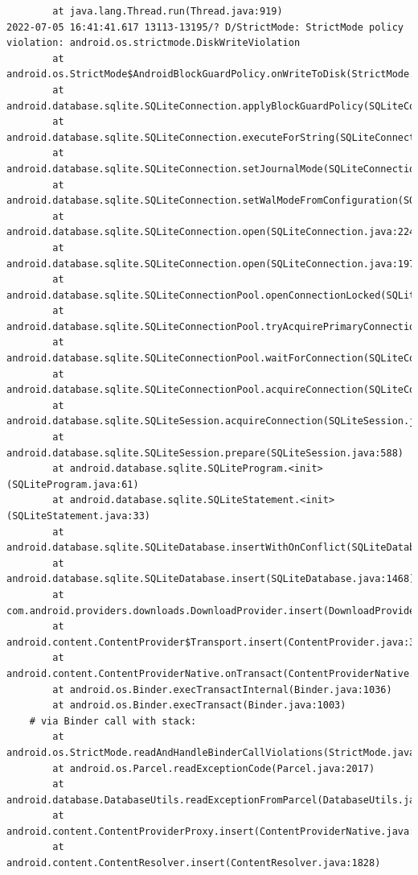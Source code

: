 \documentclass[a4paper,12pt]{book}
\begin{document}
\begin{lstlisting}
        at java.lang.Thread.run(Thread.java:919)
2022-07-05 16:41:41.617 13113-13195/? D/StrictMode: StrictMode policy violation: android.os.strictmode.DiskWriteViolation
        at android.os.StrictMode$AndroidBlockGuardPolicy.onWriteToDisk(StrictMode.java:1527)
        at android.database.sqlite.SQLiteConnection.applyBlockGuardPolicy(SQLiteConnection.java:1140)
        at android.database.sqlite.SQLiteConnection.executeForString(SQLiteConnection.java:733)
        at android.database.sqlite.SQLiteConnection.setJournalMode(SQLiteConnection.java:376)
        at android.database.sqlite.SQLiteConnection.setWalModeFromConfiguration(SQLiteConnection.java:316)
        at android.database.sqlite.SQLiteConnection.open(SQLiteConnection.java:224)
        at android.database.sqlite.SQLiteConnection.open(SQLiteConnection.java:197)
        at android.database.sqlite.SQLiteConnectionPool.openConnectionLocked(SQLiteConnectionPool.java:505)
        at android.database.sqlite.SQLiteConnectionPool.tryAcquirePrimaryConnectionLocked(SQLiteConnectionPool.java:949)
        at android.database.sqlite.SQLiteConnectionPool.waitForConnection(SQLiteConnectionPool.java:699)
        at android.database.sqlite.SQLiteConnectionPool.acquireConnection(SQLiteConnectionPool.java:380)
        at android.database.sqlite.SQLiteSession.acquireConnection(SQLiteSession.java:896)
        at android.database.sqlite.SQLiteSession.prepare(SQLiteSession.java:588)
        at android.database.sqlite.SQLiteProgram.<init>(SQLiteProgram.java:61)
        at android.database.sqlite.SQLiteStatement.<init>(SQLiteStatement.java:33)
        at android.database.sqlite.SQLiteDatabase.insertWithOnConflict(SQLiteDatabase.java:1597)
        at android.database.sqlite.SQLiteDatabase.insert(SQLiteDatabase.java:1468)
        at com.android.providers.downloads.DownloadProvider.insert(DownloadProvider.java:972)
        at android.content.ContentProvider$Transport.insert(ContentProvider.java:309)
        at android.content.ContentProviderNative.onTransact(ContentProviderNative.java:154)
        at android.os.Binder.execTransactInternal(Binder.java:1036)
        at android.os.Binder.execTransact(Binder.java:1003)
    # via Binder call with stack:
        at android.os.StrictMode.readAndHandleBinderCallViolations(StrictMode.java:2289)
        at android.os.Parcel.readExceptionCode(Parcel.java:2017)
        at android.database.DatabaseUtils.readExceptionFromParcel(DatabaseUtils.java:137)
        at android.content.ContentProviderProxy.insert(ContentProviderNative.java:481)
        at android.content.ContentResolver.insert(ContentResolver.java:1828)

\end{lstlisting}
\end{document}
